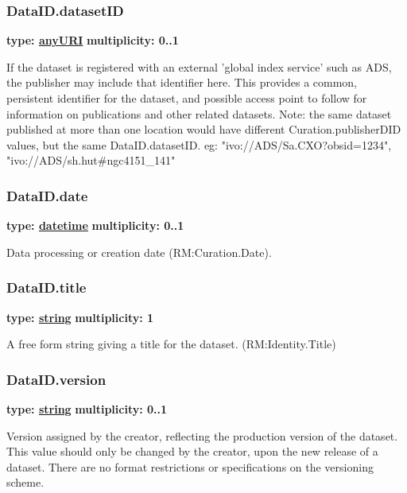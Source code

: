   \subsubsection{DataID.datasetID}
  \textbf{type: \hyperref[sect:ivoa]{anyURI}} \newline
  \textbf{multiplicity: 0..1} \newline
  
  If the dataset is registered with an external 'global index service' such as
  ADS, the publisher may include that identifier here. This provides a common,
  persistent identifier for the dataset, and possible access point to follow
  for information on publications and other related datasets. Note: the same
  dataset published at more than one location would have different
  Curation.publisherDID values, but the same DataID.datasetID.
  eg: "ivo://ADS/Sa.CXO?obsid=1234", "ivo://ADS/sh.hut\#ngc4151\_141"
  
  \subsubsection{DataID.date}
  \textbf{type: \hyperref[sect:dates]{datetime}} \newline
  \textbf{multiplicity: 0..1} \newline
  
  Data processing or creation date (RM:Curation.Date).
  
  \subsubsection{DataID.title}
  \textbf{type: \hyperref[sect:ivoa]{string}} \newline
  \textbf{multiplicity: 1} \newline
  
  A free form string giving a title for the dataset. (RM:Identity.Title)
  
  \subsubsection{DataID.version}
  \textbf{type: \hyperref[sect:ivoa]{string}} \newline
  \textbf{multiplicity: 0..1} \newline
  
  Version assigned by the creator, reflecting the production version of the
  dataset. This value should only be changed by the creator, upon the new
  release of a dataset. There are no format restrictions or specifications
  on the versioning scheme.

